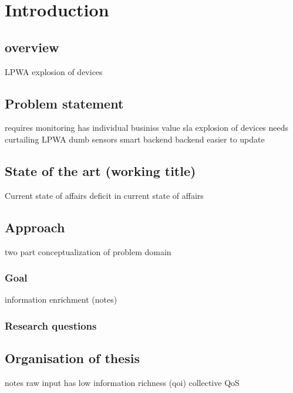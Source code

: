 \chapter{Introduction}
\section{overview} 
LPWA
explosion of devices

\section{Problem statement}
requires monitoring
	has individual businiss value
		sla
	explosion of devices needs curtailing
LPWA
	dumb sensors smart backend
	backend easier to update

\section{State of the art (working title)}
Current state of affairs 
deficit in current state of affairs
\section{Approach}
two part
	conceptualization of problem domain
	
\subsection{Goal}
information enrichment (notes)
\subsection{Research questions}
\section{Organisation of thesis}

notes
raw input has low information richness (qoi)
collective QoS